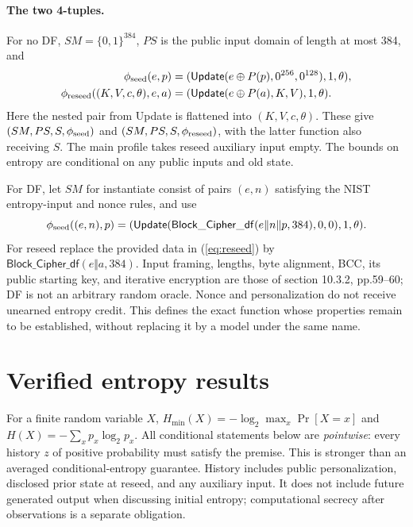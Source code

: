 \documentclass[11 pt,a 4 paper]{article}
\newcommand{\bits}{\{0,1\}}
\newcommand{\hm}{H_{\min}}
\newcommand{\Upd}{\mathsf{Update}}
\newcommand{\DF}{\mathsf{Block\_Cipher\_df}}
\begin{document}
\paragraph{The two 4-tuples.} For no DF, $ SM=\bits^{384}$, $ PS $ is the public input domain of length at most 384, and
\begin{align}
 \phi_{\rm seed}(e,p)&=(\Upd(e\oplus P(p),0^{256},0^{128}),1,\theta),\label{eq:seed}\\
 \phi_{\rm reseed}((K,V,c,\theta),e,a)&=(\Upd(e\oplus P(a),K,V),1,\theta).\label{eq:reseed}
\end{align}
Here the nested pair from Update is flattened into $(K,V,c,\theta)$. These give $(SM,PS,S,\phi_{\rm seed})$ and $(SM,PS,S,\phi_{\rm reseed})$, with the latter function also receiving $ S $. The main profile takes reseed auxiliary input empty. The bounds on entropy are conditional on any public inputs and old state.

For DF, let $ SM $ for instantiate consist of pairs $(e,n)$ satisfying the NIST entropy-input and nonce rules, and use
\[
 \phi_{\rm seed}((e,n),p)=(\Upd(\DF(e\Vert n\Vert p,384),0,0),1,\theta).
\]
For reseed replace the provided data in (\ref{eq:reseed}) by $\DF(e\Vert a,384)$. Input framing, lengths, byte alignment, BCC, its public starting key, and iterative encryption are those of section 10.3.2, pp.59--60; DF is not an arbitrary random oracle. Nonce and personalization do not receive unearned entropy credit. This defines the exact function whose properties remain to be established, without replacing it by a model under the same name.

\section{Verified entropy results}
For a finite random variable $ X $, $\hm(X)=-\log_2\max_x\Pr[X=x]$ and $ H(X)=-\sum_x p_x\log_2 p_x $. All conditional statements below are \emph{pointwise}: every history $ z $ of positive probability must satisfy the premise. This is stronger than an averaged conditional-entropy guarantee. History includes public personalization, disclosed prior state at reseed, and any auxiliary input. It does not include future generated output when discussing initial entropy; computational secrecy after observations is a separate obligation.
\end{document}
